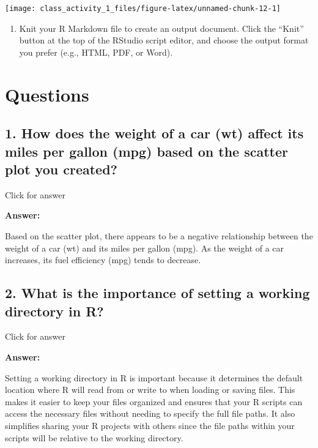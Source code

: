 \documentclass[
]{book}
\providecommand{\tightlist}{%
  \setlength{\itemsep}{0pt}\setlength{\parskip}{0pt}}
\begin{document}
\texttt{[image: class\_activity\_1\_files/figure-latex/unnamed-chunk-12-1]}

\begin{enumerate}
\def\labelenumi{\arabic{enumi}.}
\setcounter{enumi}{2}
\tightlist
\item
  Knit your R Markdown file to create an output document. Click the ``Knit'' button at the top of the RStudio script editor, and choose the output format you prefer (e.g., HTML, PDF, or Word).
\end{enumerate}

\vspace*{0.5in}

\hypertarget{questions}{%
\section{Questions}\label{questions}}

\hypertarget{how-does-the-weight-of-a-car-wt-affect-its-miles-per-gallon-mpg-based-on-the-scatter-plot-you-created}{%
\subsection{1. How does the weight of a car (wt) affect its miles per gallon (mpg) based on the scatter plot you created?}\label{how-does-the-weight-of-a-car-wt-affect-its-miles-per-gallon-mpg-based-on-the-scatter-plot-you-created}}

Click for answer

\textbf{Answer:}

Based on the scatter plot, there appears to be a negative relationship between the weight of a car (wt) and its miles per gallon (mpg). As the weight of a car increases, its fuel efficiency (mpg) tends to decrease.

\vspace*{0.5in}

\hypertarget{what-is-the-importance-of-setting-a-working-directory-in-r}{%
\subsection{2. What is the importance of setting a working directory in R?}\label{what-is-the-importance-of-setting-a-working-directory-in-r}}

Click for answer

\textbf{Answer:}

Setting a working directory in R is important because it determines the default location where R will read from or write to when loading or saving files. This makes it easier to keep your files organized and ensures that your R scripts can access the necessary files without needing to specify the full file paths. It also simplifies sharing your R projects with others since the file paths within your scripts will be relative to the working directory.
\end{document}
